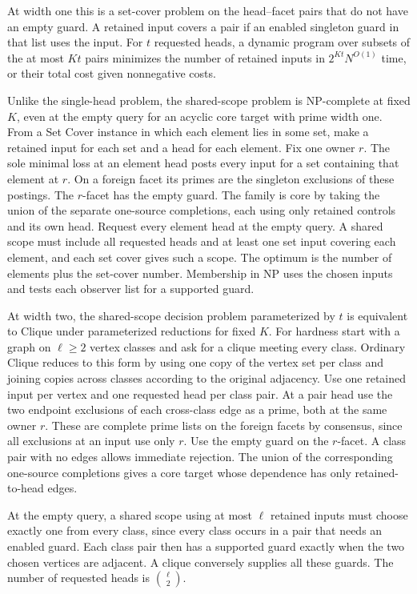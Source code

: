 At width one this is a set-cover problem on the
head--facet pairs that do not have an empty guard.
A retained input covers a pair if an enabled
singleton guard in that list uses the input.
For $t$ requested heads, a dynamic program over
subsets of the at most $Kt$ pairs minimizes the
number of retained inputs in $2^{Kt}N^{O(1)}$
time, or their total cost given nonnegative costs.

Unlike the single-head problem, the shared-scope problem
is NP-complete at fixed $K$, even at the empty query for
an acyclic core target with prime width one. From a Set
Cover instance in which each element lies in some set, make
a retained input for each set and a head for each element.
Fix one owner $r$. The sole minimal loss at an element head
posts every input for a set containing that element at $r$.
On a foreign facet its primes are the singleton exclusions
of these postings. The $r$-facet has the empty guard.
The family is core by taking the union of the separate
one-source completions, each using only retained controls
and its own head. Request every element head at the empty
query. A shared scope must include all requested heads and
at least one set input covering each element, and each set
cover gives such a scope. The optimum is the number of
elements plus the set-cover number. Membership in NP uses
the chosen inputs and tests each observer list for a
supported guard.

At width two, the shared-scope decision problem
parameterized by $t$ is equivalent to Clique under
parameterized reductions for fixed $K$. For hardness
start with a graph on $\ell\geq2$ vertex classes and
ask for a clique meeting every class. Ordinary Clique
reduces to this form by using one copy of the vertex
set per class and joining copies across classes
according to the original adjacency. Use one retained
input per vertex and one requested head per class pair.
At a pair head use the two endpoint exclusions of
each cross-class edge as a prime, both at the same
owner $r$. These are complete prime lists on the
foreign facets by consensus, since all exclusions at
an input use only $r$. Use the empty guard on the
$r$-facet. A class pair with no edges allows immediate
rejection. The union of the corresponding one-source
completions gives a core target whose dependence has
only retained-to-head edges.

At the empty query, a shared scope using at most
$\ell$ retained inputs must choose exactly one
from every class, since every class occurs in a
pair that needs an enabled guard. Each class pair
then has a supported guard exactly when the two
chosen vertices are adjacent. A clique conversely
supplies all these guards. The number of requested
heads is $\binom{\ell}{2}$.

